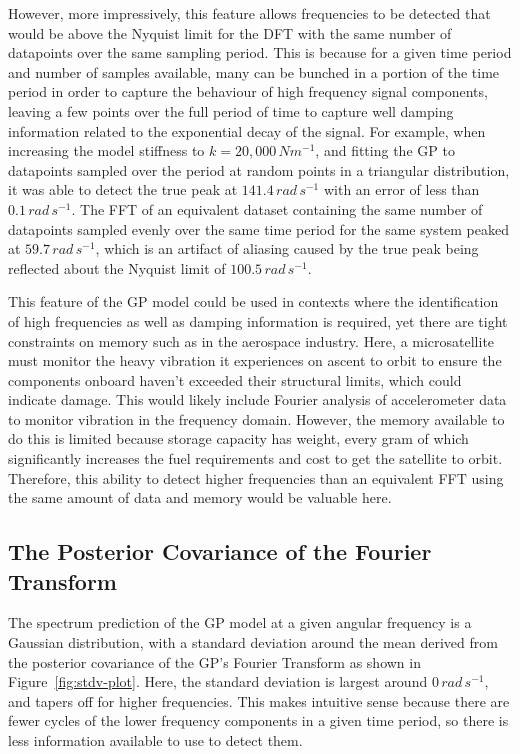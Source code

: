 \documentclass[12pt]{article}
\begin{document}
    However, more impressively, this feature allows frequencies to be detected that would be above the Nyquist limit for the DFT with the same number of datapoints over the same sampling period.
    This is because for a given time period and number of samples available, many can be bunched in a portion of the time period in order to capture the behaviour of high frequency signal components, leaving a few points over the full period of time to capture well damping information related to the exponential decay of the signal.
    For example, when increasing the model stiffness to $k = 20,000 \, Nm^{-1}$, and fitting the GP to datapoints sampled over the period at random points in a triangular distribution, it was able to detect the true peak at $141.4 \, rad \, s^{-1}$ with an error of less than $0.1 \, rad \, s^{-1}$.
    The FFT of an equivalent dataset containing the same number of datapoints sampled evenly over the same time period for the same system peaked at $59.7 \, rad \, s^{-1}$, which is an artifact of aliasing caused by the true peak being reflected about the Nyquist limit of $100.5 \, rad \, s^{-1}$.

    This feature of the GP model could be used in contexts where the identification of high frequencies as well as damping information is required, yet there are tight constraints on memory such as in the aerospace industry.
    Here, a microsatellite must monitor the heavy vibration it experiences on ascent to orbit to ensure the components onboard haven't exceeded their structural limits, which could indicate damage.
    This would likely include Fourier analysis of accelerometer data to monitor vibration in the frequency domain.
    However, the memory available to do this is limited because storage capacity has weight, every gram of which significantly increases the fuel requirements and cost to get the satellite to orbit.
    Therefore, this ability to detect higher frequencies than an equivalent FFT using the same amount of data and memory would be valuable here.

    \subsection{The Posterior Covariance of the Fourier Transform}
    The spectrum prediction of the GP model at a given angular frequency is a Gaussian distribution, with a standard deviation around the mean derived from the posterior covariance of the GP's Fourier Transform as shown in Figure~\ref{fig:stdv-plot}.
    Here, the standard deviation is largest around $0 \, rad \, s^{-1}$, and tapers off for higher frequencies.
    This makes intuitive sense because there are fewer cycles of the lower frequency components in a given time period, so there is less information available to use to detect them.
\end{document}
